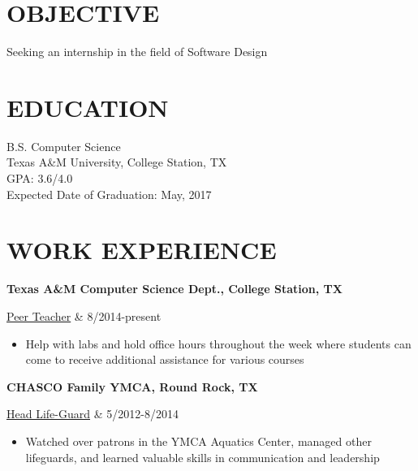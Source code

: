 \documentclass[margin,11pt]{res} %
\begin{document}

\address{{\bf Contact Information}\\ Phone: (406)-531-6150\\Email: jaideng123@yahoo.com \\}
\address{ {\bf Permanent Address} \\ 1104 April Meadows Loop \\ Georgetown, TX 78626 \\
       }

\begin{resume}
 
\section{OBJECTIVE}  
     Seeking an internship in the field of Software Design
 
\section{EDUCATION}       B.S. Computer Science  \\
                Texas A\&M University, College Station, TX \\ 
                GPA: 3.6/4.0 \\
                Expected Date of Graduation: May, 2017
 
 
\section{WORK EXPERIENCE}   
				{\bf Texas A\&M Computer Science Dept., College Station, TX} \\ 
                \begin{ncolumn}{2} %
                \underline{Peer Teacher} &   8/2014-present 
                \end{ncolumn}
                \begin{itemize}           
                \item[] Help with labs and hold office hours throughout the week where 
                students can come to receive additional assistance for various courses
                \end{itemize} 
                {\bf CHASCO Family YMCA, Round Rock, TX} \\ 
                \begin{ncolumn}{2} %
                \underline{Head Life-Guard} &   5/2012-8/2014 
                \end{ncolumn}
                \begin{itemize}   
                \item[] Watched over patrons in the YMCA Aquatics Center, managed other lifeguards, and learned valuable skills in communication and leadership
                \end{itemize}
 

\end{resume}
\end{document}
